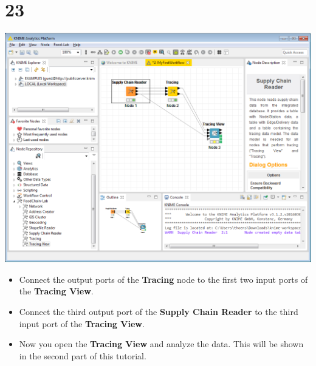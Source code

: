 \documentclass[10pt]{beamer}
\begin{document}
\section{23}
\begin{frame}
	\begin{center}
  		\includegraphics[height=0.6\textheight]{23.png}
	\end{center}
	\begin{itemize}
		\item Connect the output ports of the \textbf{Tracing} node to the first two input ports of the \textbf{Tracing View}.
		\item Connect the third output port of the \textbf{Supply Chain Reader} to the third input port of the \textbf{Tracing View}.
		\item Now you open the \textbf{Tracing View} and analyze the data. This will be shown in the second part of this tutorial.
	\end{itemize}
\end{frame}
\end{document}
